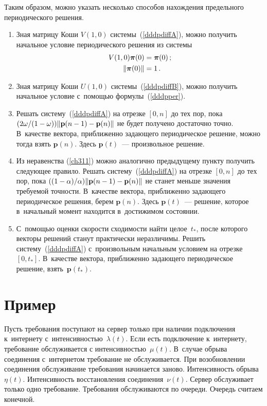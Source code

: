 \begin{multicols}{2}
Таким образом, можно указать несколько способов нахождения
предельного периодического решения.
\begin{enumerate}
\item Зная матрицу Коши $V(1,0)$ системы~(\ref{dddpdiffA}), можно 
получить
начальное условие периодического решения из системы
\begin{align*}
V(1,0)\boldsymbol{\pi}(0)&=\boldsymbol{\pi}(0)\,;\\
\|\boldsymbol{\pi}(0)\|&=1\,.
\end{align*}
\item
Зная матрицу Коши $U(1,0)$ системы~(\ref{dddpdiffB}), можно получить
начальное условие с~помощью формулы~(\ref{dddpper}).
\item
Решать систему~(\ref{dddpdiffA}) на отрезке $[0,n]$ до тех пор, пока
$({2\omega}/({1-\omega}))\|\mathbf{p}(n\hm-1)\hm-\mathbf{p}(n)\|$ не 
будет получено
достаточно точно. В~качестве вектора, приближенно задающего
периодическое решение, можно тогда взять $\mathbf{p}(n)$. Здесь 
$\mathbf{p}(t)$~--- произвольное решение.
\item Из неравенства (\ref{ch311}) можно аналогично предыдущему пункту 
получить следующее правило.
Решать систему~(\ref{dddpdiffA}) на отрезке $[0,n]$ до тех пор, пока
$(({1-\alpha})/{\alpha})\|\mathbf{p}(n\hm-1)\hm-\mathbf{p}(n)\|$ не 
станет меньше значения
требуемой точности. В~качестве вектора, приближенно задающего
периодическое решения, берем $\mathbf{p}(n)$. Здесь $\mathbf{p}(t)$~--- 
решение, которое в~начальный момент находится в~достижимом состоянии.
\item С~помощью оценки скорости сходимости \mbox{найти} целое~$t_*$, после 
которого векторы решений станут практически неразличимы.
Решить сис\-те\-му~(\ref{dddpdiffA}) с~произвольным начальным условием
на отрезке $[0,t_*]$. В~качестве вектора, приближенно задающего
периодическое решение, взять~$\mathbf{p}(t_*)$.
\end{enumerate}

\vspace*{-6pt}

\section{Пример}

\vspace*{-2pt}

Пусть требования поступают на сервер только
при наличии подключения к~интернету с~интенсивностью~$\lambda(t)$.
Если есть подключение к~интернету, требование обслуживается с
интенсивностью~$\mu(t)$. В~случае обрыва соединения с~интернетом
требование не обслуживается. При возобновлении соединения
обслуживание требования начинается заново. Интенсивность обрыва
$\eta(t)$. Интенсивность восстановления соединения~$\nu(t)$. Сервер
обслуживает только одно требование. Требования обслуживаются по
очереди. Очередь считаем конечной.


\end{multicols}
